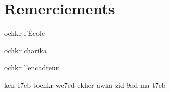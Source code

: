 \documentclass[12pt,a4paper]{report}
\begin{document}
\chapter*{\huge Remerciements}

    
ochkr l'École

\vspace*{0.5cm}
ochkr charika

\vspace*{0.5cm}
ochkr l'encadreur

\vspace*{0.5cm}
ken t7eb tochkr we7ed ekher awka zid 9ad ma t7eb
\end{document}
